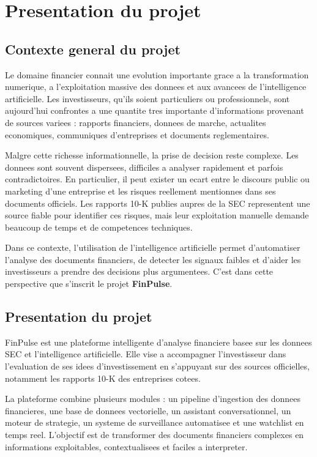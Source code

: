 
\chapter{Presentation du projet}

\section{Contexte general du projet}

Le domaine financier connait une evolution importante grace a la transformation
numerique, a l'exploitation massive des donnees et aux avancees de l'intelligence
artificielle. Les investisseurs, qu'ils soient particuliers ou professionnels, sont
aujourd'hui confrontes a une quantite tres importante d'informations provenant de
sources variees : rapports financiers, donnees de marche, actualites economiques,
communiques d'entreprises et documents reglementaires.

Malgre cette richesse informationnelle, la prise de decision reste complexe. Les
donnees sont souvent dispersees, difficiles a analyser rapidement et parfois
contradictoires. En particulier, il peut exister un ecart entre le discours public ou
marketing d'une entreprise et les risques reellement mentionnes dans ses documents
officiels. Les rapports 10-K publies aupres de la SEC representent une source fiable
pour identifier ces risques, mais leur exploitation manuelle demande beaucoup de temps
et de competences techniques.

Dans ce contexte, l'utilisation de l'intelligence artificielle permet d'automatiser
l'analyse des documents financiers, de detecter les signaux faibles et d'aider les
investisseurs a prendre des decisions plus argumentees. C'est dans cette perspective
que s'inscrit le projet \textbf{FinPulse}.

\section{Presentation du projet}

FinPulse est une plateforme intelligente d'analyse financiere basee sur les donnees
SEC et l'intelligence artificielle. Elle vise a accompagner l'investisseur dans
l'evaluation de ses idees d'investissement en s'appuyant sur des sources officielles,
notamment les rapports 10-K des entreprises cotees.

La plateforme combine plusieurs modules : un pipeline d'ingestion des donnees
financieres, une base de donnees vectorielle, un assistant conversationnel, un moteur
de strategie, un systeme de surveillance automatisee et une watchlist en temps reel.
L'objectif est de transformer des documents financiers complexes en informations
exploitables, contextualisees et faciles a interpreter.

